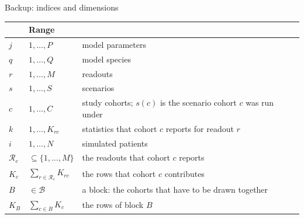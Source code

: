 \documentclass[10pt,aspectratio=169]{beamer}
\newcommand{\Rset}{\mathcal{R}}
\newcommand{\Bset}{\mathcal{B}}
\begin{document}
\begin{frame}[t]{Backup: indices and dimensions}
  \begin{center}\small
  \begin{tabularx}{\textwidth}{@{}llX@{}}
    \toprule
     & Range & \\
    \midrule
    $j$ & $1,\dots,P$ & model parameters \\
    $q$ & $1,\dots,Q$ & model species \\
    $r$ & $1,\dots,M$ & readouts \\
    $s$ & $1,\dots,S$ & scenarios \\
    $c$ & $1,\dots,C$ & study cohorts; $s(c)$ is the scenario cohort $c$ was run under \\
    $k$ & $1,\dots,K_{rc}$ & statistics that cohort $c$ reports for readout $r$ \\
    $i$ & $1,\dots,N$ & simulated patients \\
    $\Rset_c$ & $\subseteq\{1,\dots,M\}$ & the readouts that cohort $c$ reports \\
    $K_c$ & $\sum_{r\in\Rset_c}K_{rc}$ & the rows that cohort $c$ contributes \\
    $B$ & $\in\Bset$ & a block: the cohorts that have to be drawn together \\
    $K_B$ & $\sum_{c\in B}K_c$ & the rows of block $B$ \\
    \bottomrule
  \end{tabularx}
  \end{center}
\end{frame}
\end{document}
